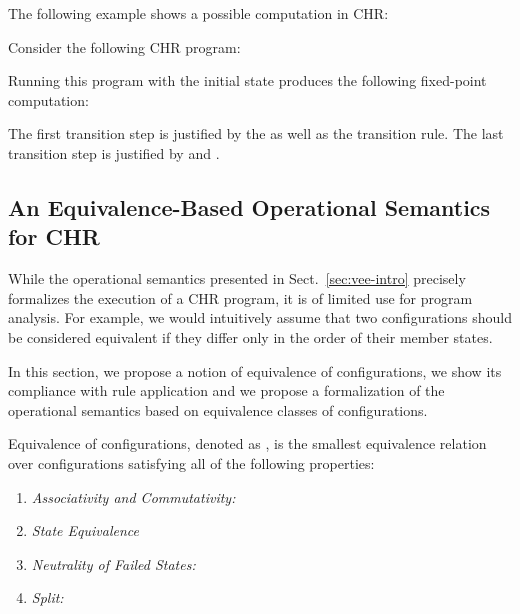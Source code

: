 \documentclass[acmtocl]{acmtrans2m}
\newcommand{\chrv}{CHR}
\begin{document}
\noindent The following example shows a possible computation in \chrv:

\begin{example}
	\label{example:albatross}
Consider the following CHR program:

Running this program with the initial state  produces the following fixed-point computation:

The first transition step is justified by the  as well as the
 transition rule. The last transition step is justified by  and
.
\end{example}

\subsection{An Equivalence-Based Operational Semantics for CHR}
\label{sec:vee-oesq}

While the operational semantics presented in Sect.~\ref{sec:vee-intro}
precisely formalizes the execution of a CHR program, it is of limited use
for program analysis. For example, we would intuitively assume that two
configurations should be considered equivalent if they differ only in the order of
their member states.

In this section, we propose a notion of equivalence of configurations, we show
its compliance with rule application and we propose a formalization of the
operational semantics based on equivalence classes of configurations.

\begin{definition}
\label{def:vee-config-equiv}
Equivalence of configurations, denoted as , is the
smallest equivalence relation over configurations satisfying all of the following
properties:
  \begin{enumerate}
      \item \label{cond:vce_ac}
	\emph{Associativity and Commutativity:}
      
      \item \label{cond:vce_steq}
	\emph{State Equivalence}
      
      \item \label{cond:vce_fail}
	\emph{Neutrality of Failed States:}
      
      \item \label{cond:vce_split}
	\emph{Split:}
      
  \end{enumerate}
\end{definition}
\end{document}
